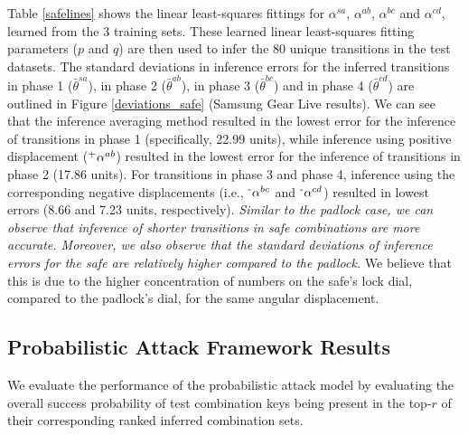 \documentclass[]{IEEEtran}
\begin{document}
Table \ref{safelines} shows the linear least-squares fittings for $\alpha^{sa}$, $\alpha^{ab}$, $\alpha^{bc}$ and $\alpha^{cd}$, learned from the 3 training sets. These learned linear least-squares fitting parameters ($p$ and $q$) are then used to infer the 80 unique transitions in the test datasets. The standard deviations in inference errors for the inferred transitions in phase 1 ($\bar{\theta}^{sa}$), in phase 2 ($\bar{\theta}^{ab}$), in phase 3 ($\bar{\theta}^{bc}$) and in phase 4 ($\bar{\theta}^{cd}$) are outlined in Figure \ref{deviations_safe} (Samsung Gear Live results). We can see that the inference averaging method resulted in the lowest error for the inference of transitions in phase 1  (specifically, 22.99 units), while inference using positive displacement ($\textsuperscript{+}\alpha^{ab}$) resulted in the lowest error for the inference of transitions in phase 2 (17.86 units). For transitions in phase 3 and phase 4, inference using the corresponding negative displacements (i.e., $\textsuperscript{-}\alpha^{bc}$ and $\textsuperscript{-}\alpha^{cd}$) resulted in lowest errors (8.66 and 7.23 units, respectively). \emph{Similar to the padlock case, we can observe that inference of shorter transitions in safe combinations are more accurate. Moreover, we also observe that the standard deviations of inference errors for the safe are relatively higher compared to the padlock.} We believe that this is due to the higher concentration of numbers on the safe's lock dial, compared to the padlock's dial, for the same angular displacement.

\subsection{Probabilistic Attack Framework Results}
\label{eval:controlledprob}
We evaluate the performance of the probabilistic attack model by evaluating the overall success probability of test combination keys being present in the top-$r$ of their corresponding ranked inferred combination sets.
\end{document}

